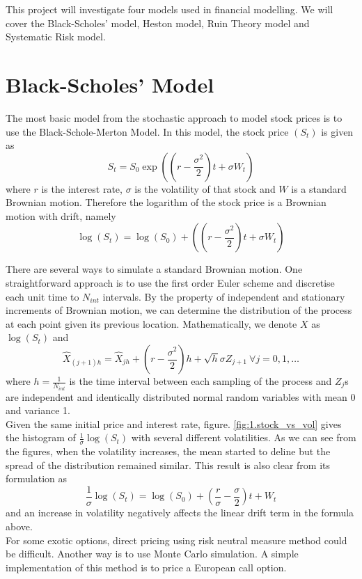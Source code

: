 \documentclass[a4paper,11pt]{article}
\begin{document}
This project will investigate four models used in financial modelling. We will cover the Black-Scholes' model, Heston model, Ruin Theory model and Systematic Risk model.\\
\section{Black-Scholes' Model}
The most basic model from the stochastic approach to model stock prices is to use the Black-Schole-Merton Model\citep{Black1973}. In this model, the stock price $(S_t)$ is given as
$$S_t = S_0 \exp\left( (r - \frac{\sigma^2}{2} )t + \sigma W_t \right)$$
where $r$ is the interest rate, $\sigma$ is the volatility of that stock and $W$ is a standard Brownian motion. Therefore the logarithm of the stock price is a Brownian motion with drift, namely 
$$\log(S_t) = \log(S_0) + ((r - \frac{\sigma^2}{2} )t + \sigma W_t )$$

There are several ways to simulate a standard Brownian motion. One straightforward approach is to use the first order Euler scheme and discretise each unit time to $N_{int}$ intervals. By the property of independent and stationary increments of Brownian motion, we can determine the distribution of the process at each point given its previous location. Mathematically, we denote $X$ as $\log(S_t)$ and
$$ \hat{X}_{(j+1)h} = \hat{X}_{jh} +( r-\frac{\sigma^2}{2})h +\sqrt{h} \sigma Z_{j+1}\  \forall j = 0, 1, \dots $$
where $h = \frac{1}{N_{int}}$ is the time interval between each sampling of the process and $Z_j$s are independent and identically distributed normal random variables with mean 0 and variance 1.\\

Given the same initial price and interest rate, figure. \ref{fig:1.stock_vs_vol} gives the histogram of $\frac{1}{\sigma}\log(S_t)$ with several different volatilities. As we can see from the figures, when the volatility increases, the mean started to deline but the spread of the distribution remained similar. This result is also clear from its formulation as 
$$\frac{1}{\sigma}\log(S_t) = \log(S_0) + (\frac{r}{\sigma} - \frac{\sigma}{2} )t + W_t$$
and an increase in volatility negatively affects the linear drift term in the formula above.\\

For some exotic options, direct pricing using risk neutral measure method could be difficult. Another way is to use Monte Carlo simulation. A simple implementation of this method is to price a European call option. \\
\end{document}
